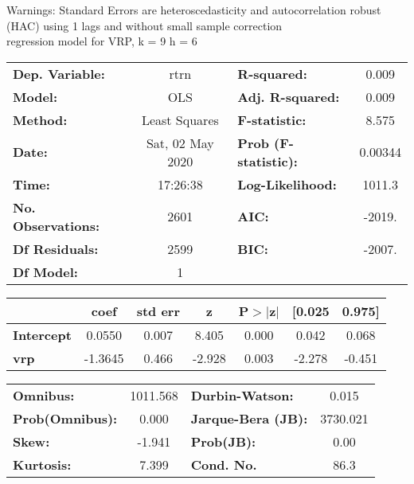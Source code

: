 Warnings: \newline
 [1] Standard Errors are heteroscedasticity and autocorrelation robust (HAC) using 1 lags and without small sample correction\\ 

regression model for VRP, k = 9 h = 6\begin{center}
\begin{tabular}{lclc}
\toprule
\textbf{Dep. Variable:}    &       rtrn       & \textbf{  R-squared:         } &     0.009   \\
\textbf{Model:}            &       OLS        & \textbf{  Adj. R-squared:    } &     0.009   \\
\textbf{Method:}           &  Least Squares   & \textbf{  F-statistic:       } &     8.575   \\
\textbf{Date:}             & Sat, 02 May 2020 & \textbf{  Prob (F-statistic):} &  0.00344    \\
\textbf{Time:}             &     17:26:38     & \textbf{  Log-Likelihood:    } &    1011.3   \\
\textbf{No. Observations:} &        2601      & \textbf{  AIC:               } &    -2019.   \\
\textbf{Df Residuals:}     &        2599      & \textbf{  BIC:               } &    -2007.   \\
\textbf{Df Model:}         &           1      & \textbf{                     } &             \\
\bottomrule
\end{tabular}
\begin{tabular}{lcccccc}
                   & \textbf{coef} & \textbf{std err} & \textbf{z} & \textbf{P$> |$z$|$} & \textbf{[0.025} & \textbf{0.975]}  \\
\midrule
\textbf{Intercept} &       0.0550  &        0.007     &     8.405  &         0.000        &        0.042    &        0.068     \\
\textbf{vrp}       &      -1.3645  &        0.466     &    -2.928  &         0.003        &       -2.278    &       -0.451     \\
\bottomrule
\end{tabular}
\begin{tabular}{lclc}
\textbf{Omnibus:}       & 1011.568 & \textbf{  Durbin-Watson:     } &    0.015  \\
\textbf{Prob(Omnibus):} &   0.000  & \textbf{  Jarque-Bera (JB):  } & 3730.021  \\
\textbf{Skew:}          &  -1.941  & \textbf{  Prob(JB):          } &     0.00  \\
\textbf{Kurtosis:}      &   7.399  & \textbf{  Cond. No.          } &     86.3  \\
\bottomrule
\end{tabular}
\end{center}

